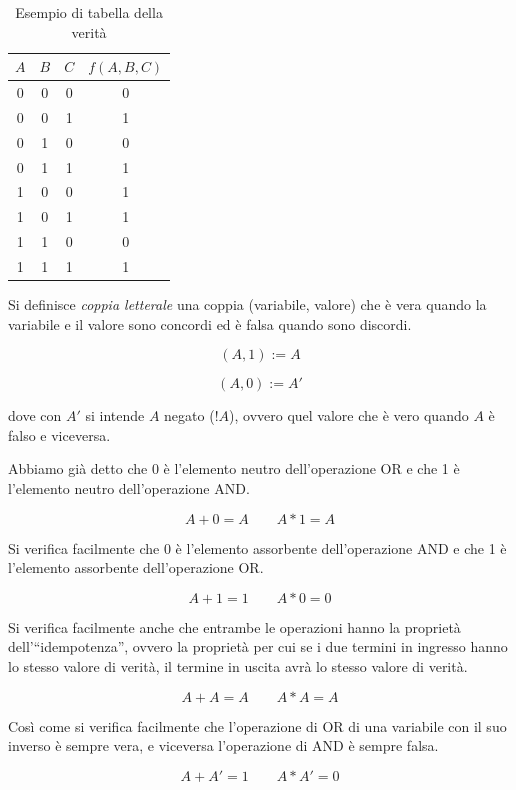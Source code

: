 \documentclass{article}
\begin{document}
\begin{table}[h]
  \centering
  \begin{tabular}{| c | c | c | c |}
  \hline
  $A$ & $B$ & $C$ & $f(A, B, C)$ \\ \hline
  0 & 0 & 0 & 0 \\ \hline
  0 & 0 & 1 & 1 \\ \hline
  0 & 1 & 0 & 0 \\ \hline
  0 & 1 & 1 & 1 \\ \hline
  1 & 0 & 0 & 1 \\ \hline
  1 & 0 & 1 & 1 \\ \hline
  1 & 1 & 0 & 0 \\ \hline
  1 & 1 & 1 & 1 \\ \hline
  \end{tabular}
  \caption{Esempio di tabella della verità}
  \label{Tabella_verita}
\end{table}

Si definisce \textit{coppia letterale} una coppia (variabile, valore) che è vera quando la variabile e il valore sono concordi ed è falsa quando sono discordi.

\[(A,1) := A\]

\[(A,0) := A'\]

dove con $A'$ si intende $A$ negato ($!A$), ovvero quel valore che è vero quando $A$ è falso e viceversa.

\vspace{3mm}

Abbiamo già detto che 0 è l'elemento neutro dell'operazione OR e che 1 è l'elemento neutro dell'operazione AND.

\[A + 0 = A \quad \quad A * 1 = A\]

Si verifica facilmente che 0 è l'elemento assorbente dell'operazione AND e che 1 è l'elemento assorbente dell'operazione OR.

\[A + 1 = 1 \quad \quad A * 0 = 0\]

Si verifica facilmente anche che entrambe le operazioni hanno la proprietà dell'``idempotenza'', ovvero la proprietà per cui se i due termini in ingresso hanno lo stesso valore di verità, il termine in uscita avrà lo stesso valore di verità.

\[A + A = A \quad \quad A * A = A\]

Così come si verifica facilmente che l'operazione di OR di una variabile con il suo inverso è sempre vera, e viceversa l'operazione di AND è sempre falsa.

\[A + A' = 1 \quad \quad A * A' = 0\]
\end{document}

